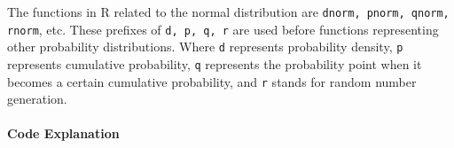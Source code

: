 \documentclass{ltjsbook}
\begin{document}
The functions in R related to the normal distribution are \texttt{dnorm, pnorm, qnorm, rnorm}, etc. These prefixes of \texttt{d, p, q, r} are used before functions representing other probability distributions. Where \texttt{d} represents probability density, \texttt{p} represents cumulative probability, \texttt{q} represents the probability point when it becomes a certain cumulative probability, and \texttt{r} stands for random number generation.


\paragraph{Code Explanation}

\end{document}
